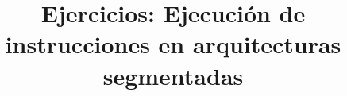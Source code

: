 

\title{Ejercicios: Ejecución de instrucciones en arquitecturas segmentadas}



\maketitle

\pagestyle{fancyplain}





